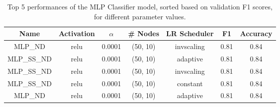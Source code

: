 \begin{table}[H]
	\centering
	\begin{tabular}{c c c c c c c}
	\hline
	\hline
	\textbf{Name} & \textbf{Activation} & \textbf{$\alpha$} & \textbf{\# Nodes} & \textbf{LR Scheduler} & \textbf{F1} & \textbf{Accuracy} \\ 
	\hline
	\hline
	MLP\_ND & relu & 0.0001 & (50, 10) & invscaling & 0.81 & 0.84 \\ 
	MLP\_SS\_ND & relu & 0.0001 & (50, 10) & adaptive & 0.81 & 0.84 \\ 
	MLP\_SS\_ND & relu & 0.0001 & (50, 10) & invscaling & 0.81 & 0.84 \\ 
	MLP\_SS\_ND & relu & 0.0001 & (50, 10) & constant & 0.81 & 0.84 \\ 
	MLP\_ND & relu & 0.0001 & (50, 10) & adaptive & 0.81 & 0.84 \\  
	\hline
	\end{tabular}

	\caption{Top 5 performances of the MLP Classifier model, sorted based on validation F1 scores, for different parameter values.}
	\label{tab:mlp}
\end{table}


